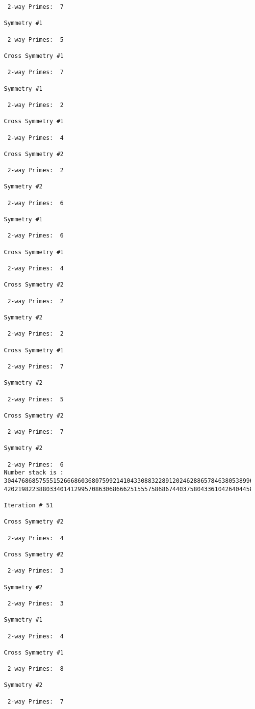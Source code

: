 \begin{verbatim}
 2-way Primes: 	7

Symmetry #1

 2-way Primes: 	5

Cross Symmetry #1

 2-way Primes: 	7

Symmetry #1

 2-way Primes: 	2

Cross Symmetry #1

 2-way Primes: 	4

Cross Symmetry #2

 2-way Primes: 	2

Symmetry #2

 2-way Primes: 	6

Symmetry #1

 2-way Primes: 	6

Cross Symmetry #1

 2-way Primes: 	4

Cross Symmetry #2

 2-way Primes: 	2

Symmetry #2

 2-way Primes: 	2

Cross Symmetry #1

 2-way Primes: 	7

Symmetry #2

 2-way Primes: 	5

Cross Symmetry #2

 2-way Primes: 	7

Symmetry #2

 2-way Primes: 	6
Number stack is :
30447686857555152666860368075992141043308832289120246288657846380538996794608835958544046240163340857
42021982238803340141299570863068666251555758686744037580433610426404458595388064976998350836487568826

Iteration #	51

Cross Symmetry #2

 2-way Primes: 	4

Cross Symmetry #2

 2-way Primes: 	3

Symmetry #2

 2-way Primes: 	3

Symmetry #1

 2-way Primes: 	4

Cross Symmetry #1

 2-way Primes: 	8

Symmetry #2

 2-way Primes: 	7


\end{verbatim}
